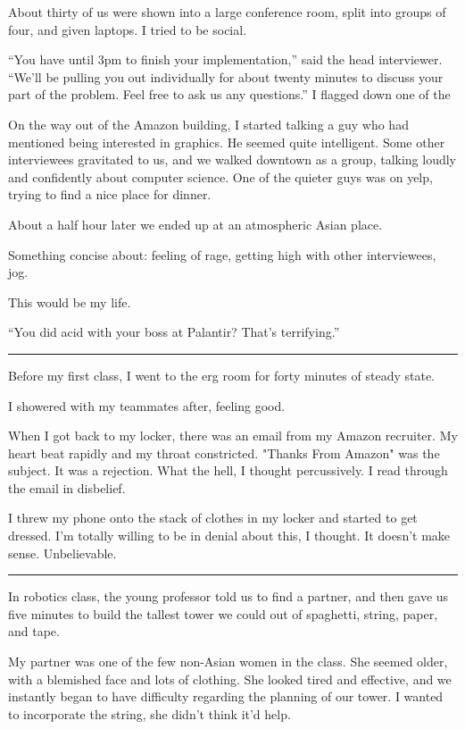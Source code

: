 About thirty of us were shown into a large conference room, split into groups of
four, and given laptops.  I tried to be social. 

``You have until 3pm to finish your implementation,'' said the head interviewer.
``We'll be pulling you out individually for about twenty minutes to discuss your
part of the problem.  Feel free to ask us any questions.'' I flagged down one of
the 

On the way out of the Amazon building, I started talking a guy who had mentioned
being interested in graphics.  He seemed quite intelligent.  Some other
interviewees gravitated to us, and we walked downtown as a group, talking loudly
and confidently about computer science.  One of the quieter guys was on yelp,
trying to find a nice place for dinner.

About a half hour later we ended up at an atmospheric Asian place.

Something concise about: feeling of rage, getting high with other interviewees, jog.

This would be my life.

``You did acid with your boss at Palantir?  That's terrifying.''

\fancybreak{***}

Before my first class, I went to the erg room for forty minutes of steady state.

I showered with my teammates after, feeling good.

When I got back to my locker, there was an email from my Amazon recruiter.  My
heart beat rapidly and my throat constricted.  "Thanks From Amazon" was the
subject.  It was a rejection.  What the hell, I thought percussively.  I read
through the email in disbelief.

I threw my phone onto the stack of clothes in my locker and started to get
dressed.  I'm totally willing to be in denial about this, I thought.  It doesn't
make sense.  Unbelievable.

\fancybreak{***}

In robotics class, the young professor told us to find a partner, and then gave
us five minutes to build the tallest tower we could out of spaghetti, string,
paper, and tape.

My partner was one of the few non-Asian women in the class.  She seemed older,
with a blemished face and lots of clothing.  She looked tired and effective, and
we instantly began to have difficulty regarding the planning of our tower.  I
wanted to incorporate the string, she didn't think it'd help.

